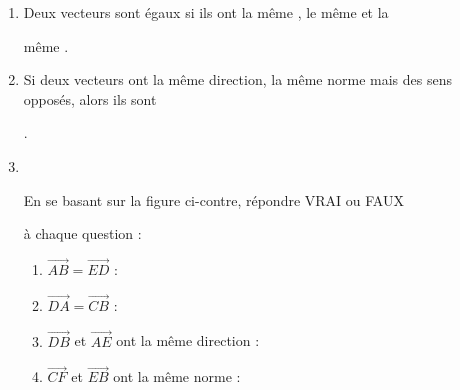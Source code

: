 \documentclass[
	classe=$2^{de}$
]{évaluation}
\begin{document}
\begin{exercice}
	\begin{enumerate}
		\item Deux vecteurs sont égaux si ils ont la même , le même  et la

		      même .
		\item Si deux vecteurs ont la même direction, la même norme mais des sens opposés, alors ils sont

		      .
		\item \

		      \begin{minipage}{0.7\linewidth}
			      En se basant sur la figure ci-contre, répondre VRAI ou FAUX

			      à chaque question :
		      \end{minipage}
		      \begin{minipage}{0.25\linewidth}
		      \end{minipage}
		      \begin{multicols}{2}
			      \begin{enumerate}
				      \item $\vec{AB} = \vec{ED}$ : 
				      \item $\vec{DA} = \vec{CB}$ : 
				      \item $\vec{DB}$ et $\vec{AE}$ ont la même direction : 
				      \item $\vec{CF}$ et $\vec{EB}$ ont la même norme : 
			      \end{enumerate}
		      \end{multicols}
	\end{enumerate}
\end{exercice}
\end{document}
